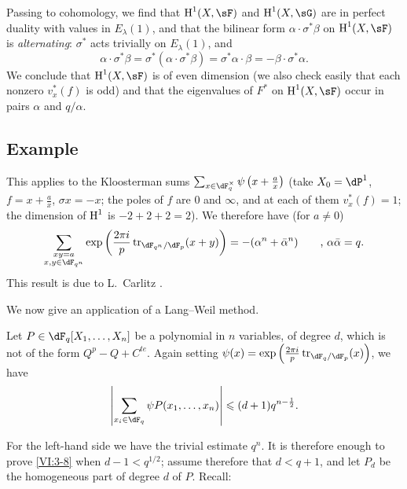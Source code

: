 Passing to cohomology, we find that $\h^1(X,\sF)$ and $\h^1(X,\sG)$ are in 
perfect duality with values in $E_\lambda(1)$, and that the bilinear form 
$\alpha\cdot \sigma^\ast\beta$ on $\h^1(X,\sF)$ is \emph{alternating}: 
$\sigma^\ast$ acts trivially on $E_\lambda(1)$, and 
\[
  \alpha\cdot \sigma^\ast \beta = \sigma^\ast(\alpha\cdot \sigma^\ast \beta) = \sigma^\ast \alpha\cdot \beta = -\beta\cdot \sigma^\ast \alpha \text{.} 
\]
We conclude that $\h^1(X,\sF)$ is of even dimension (we also check 
    easily that each nonzero $v_x^\ast(f)$ is odd) and that the 
eigenvalues of $F^\ast$ on $\h^1(X,\sF)$ occur in pairs $\alpha$ and 
$q/\alpha$. 





\subsection{Example}\label{VI:3-7}

This applies to the Kloosterman sums 
$\sum_{x\in \dF_q^\times} \psi\left(x+\frac a x\right)$ (take 
$X_0=\dP^1$, $f=x+\frac a x$, $\sigma x=-x$; the poles of $f$ are $0$ and 
$\infty$, and at each of them $v_x^\ast(f)=1$; the dimension of $\operatorname{H}^1$ is 
$-2+2+2=2$). We therefore have (for $a\ne 0$) 
\[
  \sum_{\substack{x y=a \\ x,y\in \dF_{q^n}}} \exp\left(\frac{2\pi i}{p} \tr_{\dF_{q^n}/\dF_p}(x+y)\right) = -(\alpha^n+\bar\alpha^n) \qquad \text{, }\alpha\bar \alpha = q \text{.} 
\]
This result is due to L.\ Carlitz \cite{ca69}. 

We now give an application of a Lang--Weil method. 





\begin{proposition_}\label{VI:3-8}
Let $P\in \dF_q[X_1,\dots,X_n]$ be a polynomial in $n$ variables, of degree 
$d$, which is not of the form $Q^p-Q+C^{te}$. Again setting 
$\psi(x) = \exp\left(\frac{2\pi i}{p} \tr_{\dF_q/\dF_p}(x)\right)$, we have 
\[
  \left|\sum_{x_i\in \dF_q} \psi P(x_1,\dots,x_n)\right| \leqslant (d+1) q^{n-\frac 1 2} \text{.}
\]
\end{proposition_}

For the left-hand side we have the trivial estimate $q^n$. It is therefore enough to 
prove \ref{VI:3-8} when $d-1<q^{1/2}$; assume therefore that 
$d<q+1$, and let $P_d$ be the homogeneous part of degree $d$ of $P$. Recall: 






